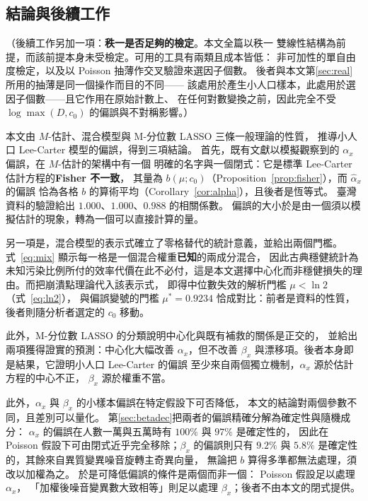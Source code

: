 \documentclass[UTF8, fontset=macnew, a4paper, 12pt]{ctexart}
\begin{document}
\subsection{結論與後續工作}\label{subsec:concl}\label{subsec:future}

\noindent（後續工作另加一項：\textbf{秩一是否足夠的檢定}。本文全篇以秩一
雙線性結構為前提，而該前提本身未受檢定。可用的工具有兩類且成本皆低：
非可加性的單自由度檢定，以及以 Poisson 抽薄作交叉驗證來選因子個數。
後者與本文第\ref{sec:real}所用的抽薄是同一個操作而目的不同——
該處用於產生小人口樣本，此處用於選因子個數——且它作用在原始計數上、
在任何對數變換之前，因此完全不受 $\log\max(D,c_0)$ 的偏誤與不對稱影響。）



本文由 $M$-估計、混合模型與 M-分位數 LASSO 三條一般理論的性質，
推導小人口 Lee-Carter 模型的偏誤，得到三項結論。
首先，既有文獻以模擬觀察到的 $\alpha_x$ 偏誤，在 $M$-估計的架構中有一個
明確的名字與一個閉式：它是標準 Lee-Carter 估計方程的\textbf{Fisher 不一致}，
其量為 $b(\mu;c_0)$（Proposition~\ref{prop:fisher}），而 $\hat\alpha_x$ 的偏誤
恰為各格 $b$ 的算術平均（Corollary~\ref{cor:alpha}），且後者是恆等式。
臺灣資料的驗證給出 $1.000$、$1.000$、$0.988$ 的相關係數。
偏誤的大小於是由一個須以模擬估計的現象，轉為一個可以直接計算的量。

另一項是，混合模型的表示式確立了零格替代的統計意義，並給出兩個門檻。
式~\eqref{eq:mix} 顯示每一格是一個混合權重\textbf{已知}的兩成分混合，
因此古典穩健統計為未知污染比例所付的效率代價在此不必付，這是本文選擇中心化而非穩健損失的理由。而把崩潰點理論代入該表示式，
即得中位數失效的解析門檻 $\mu<\ln2$（式~\eqref{eq:ln2}），
與偏誤變號的門檻 $\mu^\ast=0.9234$ 恰成對比：前者是資料的性質，
後者則隨分析者選定的 $c_0$ 移動。

此外，M-分位數 LASSO 的分類說明中心化與既有補救的關係是正交的，
並給出兩項獲得證實的預測：中心化大幅改善 $\alpha_x$，但不改善
$\beta_x$ 與漂移項。後者本身即是結果，它證明小人口 Lee-Carter 的偏誤
至少來自兩個獨立機制，$\alpha_x$ 源於估計方程的中心不正，
$\beta_x$ 源於權重不當。

此外，$\alpha_x$ 與 $\beta_x$ 的小樣本偏誤在特定假設下可否降低，
本文的結論對兩個參數不同，且差別可以量化。
第\ref{sec:betadec}把兩者的偏誤精確分解為確定性與隨機成分：
$\alpha_x$ 的偏誤在人數一萬與五萬時有 $100\%$ 與 $97\%$ 是確定性的，
因此在 Poisson 假設下可由閉式近乎完全移除；$\beta_x$ 的偏誤則只有
$9.2\%$ 與 $5.8\%$ 是確定性的，其餘來自異質變異噪音旋轉主奇異向量，
無論把 $b$ 算得多準都無法處理，須改以加權為之。
於是可降低偏誤的條件是兩個而非一個： Poisson 假設足以處理 $\alpha_x$，
「加權後噪音變異數大致相等」則足以處理 $\beta_x$；後者不由本文的閉式提供。
\end{document}
